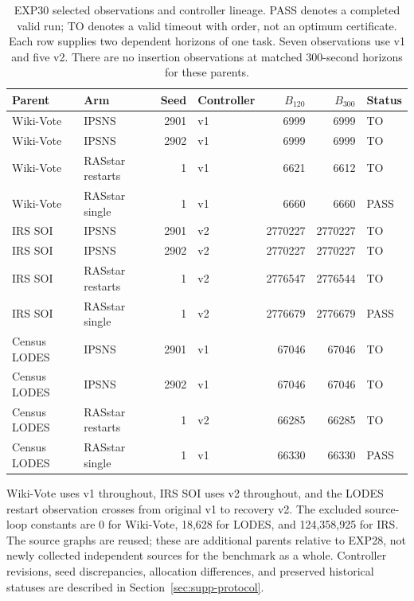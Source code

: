 \begin{table}[htbp]
\caption{EXP30 selected observations and controller lineage. PASS denotes a completed valid run; TO denotes a valid timeout with order, not an optimum certificate. Each row supplies two dependent horizons of one task. Seven observations use v1 and five v2. There are no insertion observations at matched 300-second horizons for these parents.}\label{tab:s-exp30}
\centering\small
\begin{tabular}{llrlrrl}\toprule
Parent & Arm & Seed & Controller & $B_{120}$ & $B_{300}$ & Status\\\midrule
Wiki-Vote & IPSNS & 2901 & v1 & 6999 & 6999 & TO\\
Wiki-Vote & IPSNS & 2902 & v1 & 6999 & 6999 & TO\\
Wiki-Vote & RASstar restarts & 1 & v1 & 6621 & 6612 & TO\\
Wiki-Vote & RASstar single & 1 & v1 & 6660 & 6660 & PASS\\
IRS SOI & IPSNS & 2901 & v2 & 2770227 & 2770227 & TO\\
IRS SOI & IPSNS & 2902 & v2 & 2770227 & 2770227 & TO\\
IRS SOI & RASstar restarts & 1 & v2 & 2776547 & 2776544 & TO\\
IRS SOI & RASstar single & 1 & v2 & 2776679 & 2776679 & PASS\\
Census LODES & IPSNS & 2901 & v1 & 67046 & 67046 & TO\\
Census LODES & IPSNS & 2902 & v1 & 67046 & 67046 & TO\\
Census LODES & RASstar restarts & 1 & v2 & 66285 & 66285 & TO\\
Census LODES & RASstar single & 1 & v1 & 66330 & 66330 & PASS\\
\bottomrule\end{tabular}
\end{table}

Wiki-Vote uses v1 throughout, IRS SOI uses v2 throughout, and the LODES restart observation crosses from original v1 to recovery v2. The excluded source-loop constants are 0 for Wiki-Vote, 18,628 for LODES, and 124,358,925 for IRS. The source graphs are reused; these are additional parents relative to EXP28, not newly collected independent sources for the benchmark as a whole. Controller revisions, seed discrepancies, allocation differences, and preserved historical statuses are described in Section~\ref{sec:supp-protocol}.

